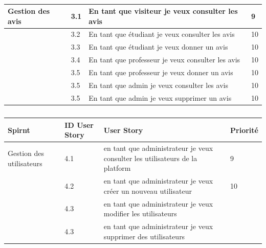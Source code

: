 \begin{table}[H]
\begin{tabular}{|p{3cm}|p{1.5cm}|p{7cm}|p{1.3cm}|}
        Gestion des avis & 3.1 &  En tant que visiteur je veux consulter les avis & 9 \\ \hline
        & 3.2 &  En tant que étudiant je veux consulter les avis & 10 \\ \hline
        & 3.3 &  En tant que étudiant je veux donner un avis & 10 \\ \hline
        & 3.4 & En tant que professeur je veux consulter les avis & 10 \\ \hline	
        & 3.5 & En tant que professeur je veux donner un avis & 10 \\ \hline
        & 3.5 & En tant que admin je veux consulter les avis & 10 \\ \hline
        & 3.5 & En tant que admin je veux supprimer un avis & 10 \\ \hline










     
    \end{tabular}
    \caption {}
    \label{tab:my_label}
	\end{table}











	\begin{table}[H] %
	    \centering
	    \begin{tabular}{|p{3cm}|p{1.5cm}|p{7cm}|p{1.3cm}|}
	        \hline
	        Spirnt & ID User Story & User Story & Priorité \\
	        \hline
            Gestion des utilisateurs  & 4.1 & en tant que administrateur je veux consulter les utilisateurs de la platform & 9 \\ \hline
        & 4.2 & en tant que administrateur je veux créer un nouveau utilisateur & 10 \\ \hline
        & 4.3 & en tant que administrateur je veux modifier les utilisateurs & \\ \hline
        & 4.3 & en tant que administrateur je veux supprimer des utilisateurs & \\ \hline
    \end{tabular}
    \caption {}
    \label{tab:my_label}
	\end{table}








